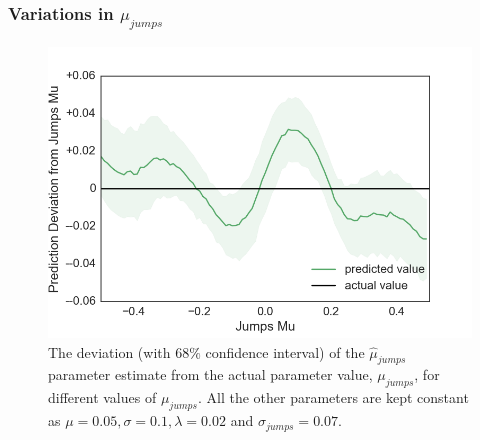 \documentclass[11pt,oneside,openany,a4paper,english, report, goldenblock
]{usthesis}
\begin{document}
\subsubsection{Variations in $\mu_{jumps}$}

\begin{figure}[h]
	\centering
	\includegraphics[width=0.7\linewidth]{Images/Output-Sensitivity-Results/ConvolutionalNN-MultipleOutput-ELU/Varying-Jumps_mu/Jumps_Mu}
	\caption{The deviation (with $68\%$ confidence interval) of the $\hat{\mu}_{jumps}$ parameter estimate from the actual parameter value, $\mu_{jumps}$, for different values of $\mu_{jumps}$. All the other parameters are kept constant as $\mu = 0.05, \sigma = 0.1, \lambda = 0.02$ and $\sigma_{jumps} = 0.07$.}
	\label{fig:sensitivity_test:multiple_output:varying_jumps_mu:jumps_mu}
\end{figure}
\end{document}
